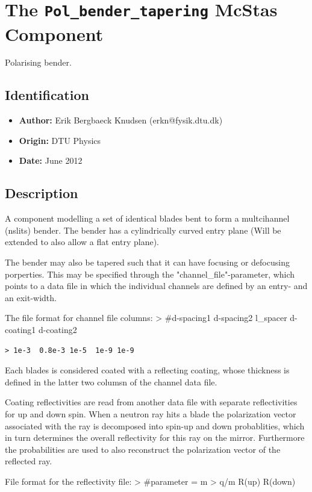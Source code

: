 \section{The \texttt{Pol\_bender\_tapering} McStas Component}
Polarising bender.

\subsection*{Identification}
\begin{itemize}
  \item \textbf{Author:} Erik Bergbaeck Knudsen (erkn@fysik.dtu.dk)
  \item \textbf{Origin:} DTU Physics
  \item \textbf{Date:} June 2012
\end{itemize}

\subsection*{Description}
A component modelling a set of identical blades bent to form a multcihannel (nslits) bender. The bender has a cylindrically curved entry plane (Will be extended to also allow a flat entry plane).

The bender may also be tapered such that it can have focusing or defocusing porperties. This may be specified through the "channel\_file"-parameter, which points to a data file in which the individual channels are defined by an entry- and an exit-width.

The file format for channel file columns: \textgreater{} \#d-spacing1 d-spacing2 l\_spacer d-coating1 d-coating2

\begin{verbatim}
> 1e-3  0.8e-3 1e-5  1e-9 1e-9
\end{verbatim}

Each blades is considered coated with a reflecting coating, whose thickness is defined in the latter two columsn of the channel data file.

Coating reflectivities are read from another data file with separate reflectivities for up and down spin. When a neutron ray hits a blade the polarization vector associated with the ray is decomposed into spin-up and down probablities, which in turn determines the overall reflectivity for this ray on the mirror. Furthermore the probabilities are used to also reconstruct the polarization vector of the reflected ray.

File format for the reflectivity file: \textgreater{} \#parameter = m \textgreater{} q/m R(up) R(down)


